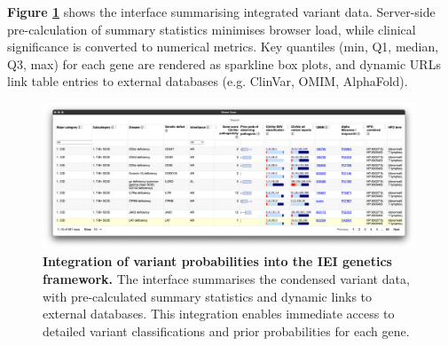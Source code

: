 \textbf{Figure \ref{fig:var_risk_est_iei_genetics}} shows the interface summarising integrated variant data. Server-side pre-calculation of summary statistics minimises browser load, while clinical significance is converted to numerical metrics. Key quantiles (min, Q1, median, Q3, max) for each gene are rendered as sparkline box plots, and dynamic URLs link table entries to external databases (e.g. ClinVar, OMIM, AlphaFold).


\begin{figure}[ht]
  \centering
  \includegraphics[width=0.99\textwidth]{../images/var_risk_est_iei_genetics.png}
  \caption{
    \textbf{Integration of variant probabilities into the IEI genetics framework.}
    The interface summarises the condensed variant data, with pre-calculated summary statistics and dynamic links to external databases. This integration enables immediate access to detailed variant classifications and prior probabilities for each gene.
  }
  \label{fig:var_risk_est_iei_genetics}
\end{figure}




